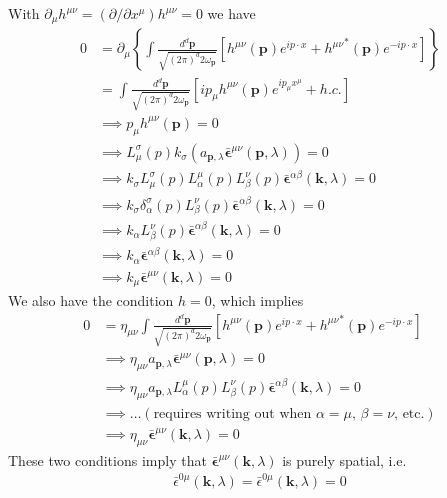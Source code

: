 \documentclass{book}
\theoremstyle{definition}
\newcommand{\p}{\partial}
\newcommand{\nn}{\nonumber}
\newcommand{\f}[2]{\frac{#1}{#2}}
\newcommand{\lp}{\left(}
\newcommand{\rp}{\right)}
\newcommand{\lb}{\left[}
\newcommand{\rb}{\right]}
\newcommand{\lc}{\left\{}
\newcommand{\rc}{\right\}}
\begin{document}
With $\p_\mu h^{\mu\nu} = (\p/\p x^\mu)h^{\mu\nu}  = 0$ we have
\begin{align}
0 &= \p_\mu \lc \int \f{d^d\mathbf{p}}{\sqrt{(2\pi)^d 2\omega_\mathbf{p}}} \lb h^{\mu\nu}(\mathbf{p})e^{ip\cdot x} + {h^{\mu\nu}}^*(\mathbf{p})e^{-ip\cdot x}\rb  \rc\nn\\
&= \int \f{d^d\mathbf{p}}{\sqrt{(2\pi)^d 2\omega_\mathbf{p}}}
\lb ip_\mu  h^{\mu\nu}(\mathbf{p})e^{ip_\mu x^\mu} + h.c. \rb\nn\\
&\implies p_\mu h^{\mu\nu}(\mathbf{p}) = 0\nn\\
&\implies L^\sigma_\mu(p)k_\sigma \lp a_{\mathbf{p},\lambda}\bar{\mathbf{\epsilon}}^{\mu\nu}(\mathbf{p},\lambda)\rp = 0\nn\\
&\implies k_\sigma L^\sigma_\mu(p)L^\mu_\alpha(p)L^\nu_\beta(p)\bar{\mathbf{\epsilon}}^{\alpha\beta}(\mathbf{k},\lambda) =0 \nn\\
&\implies k_\sigma \delta^\sigma_\alpha(p)L^\nu_\beta(p)\bar{\mathbf{\epsilon}}^{\alpha\beta}(\mathbf{k},\lambda) =0 \nn\\
&\implies k_\alpha L^\nu_\beta(p)\bar{\mathbf{\epsilon}}^{\alpha\beta}(\mathbf{k},\lambda) =0 \nn\\
&\implies k_\alpha\bar{\mathbf{\epsilon}}^{\alpha\beta}(\mathbf{k},\lambda) =0 \nn\\
&\implies \boxed{k_\mu \bar{\mathbf{\epsilon}}^{\mu\nu}(\mathbf{k},\lambda) = 0  }
\end{align} 
We also have the condition $h=0$, which implies
\begin{align}
0 &= \eta_{\mu\nu}\int \f{d^d\mathbf{p}}{\sqrt{(2\pi)^d 2\omega_\mathbf{p}}} \lb h^{\mu\nu}(\mathbf{p})e^{ip\cdot x} + {h^{\mu\nu}}^*(\mathbf{p})e^{-ip\cdot x}\rb\nn\\
&\implies \eta_{\mu\nu}a_{\mathbf{p},\lambda}\bar{\mathbf{\epsilon}}^{\mu\nu}(\mathbf{p},\lambda) = 0\nn\\
&\implies \eta_{\mu\nu}a_{\mathbf{p},\lambda}L^\mu_\alpha(p)L^\nu_\beta(p)\bar{\mathbf{\epsilon}}^{\alpha\beta}(\mathbf{k},\lambda) = 0\nn\\
&\implies \dots (\text{requires writing out when $\alpha=\mu$, $\beta=\nu$, etc.})\nn\\
&\implies \boxed{\eta_{\mu\nu}\bar{\mathbf{\epsilon}}^{\mu\nu}(\mathbf{k},\lambda) = 0}
\end{align}
These two conditions imply that $\bar{\mathbf{\epsilon}}^{\mu\nu}(\mathbf{k},\lambda)$ is purely spatial, i.e.
\begin{align}
\boxed{\bar{\epsilon}^{0\mu}(\mathbf{k},\lambda) = \bar{\epsilon}^{0\mu}(\mathbf{k},\lambda)   = 0}
\end{align}
\end{document}
